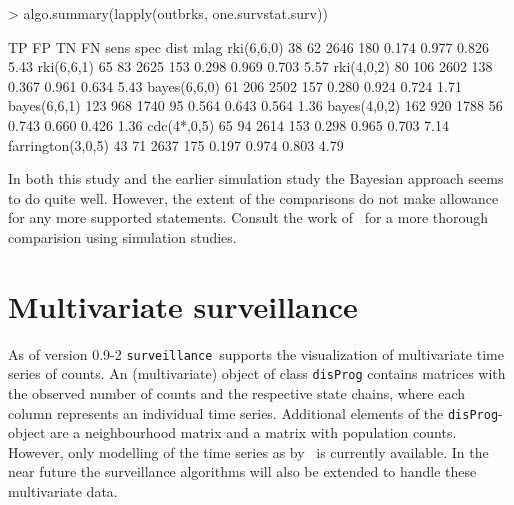 \documentclass[a4paper,11pt]{article}
\newcommand{\surveillance}{\texttt{surveillance}}
\begin{document}
\begin{Schunk}
\end{Schunk}
\begin{Schunk}
\begin{Sinput}
> algo.summary(lapply(outbrks, one.survstat.surv))
\end{Sinput}
\end{Schunk}
\begin{Schunk}
\begin{Soutput}
                   TP  FP   TN  FN  sens  spec  dist mlag
rki(6,6,0)         38  62 2646 180 0.174 0.977 0.826 5.43
rki(6,6,1)         65  83 2625 153 0.298 0.969 0.703 5.57
rki(4,0,2)         80 106 2602 138 0.367 0.961 0.634 5.43
bayes(6,6,0)       61 206 2502 157 0.280 0.924 0.724 1.71
bayes(6,6,1)      123 968 1740  95 0.564 0.643 0.564 1.36
bayes(4,0,2)      162 920 1788  56 0.743 0.660 0.426 1.36
cdc(4*,0,5)        65  94 2614 153 0.298 0.965 0.703 7.14
farrington(3,0,5)  43  71 2637 175 0.197 0.974 0.803 4.79
\end{Soutput}
\end{Schunk}

In both this study and the earlier simulation study the Bayesian
approach seems to do quite well. However, the extent of the
comparisons do not make allowance for any more supported statements.
Consult the work of~\citet{riebler2004} for a more thorough
comparision using simulation studies.

\section{Multivariate surveillance}

As of version 0.9-2 \surveillance\ supports the visualization of
multivariate time series of counts. An (multivariate) object of class
\texttt{disProg} contains matrices with the observed number of counts
and the respective state chains, where each column represents an
individual time series.  Additional elements of the
\texttt{disProg}-object are a neighbourhood matrix and a matrix with
population counts. However, only modelling of the time series as
by~\citet{held2005} is currently available. In the near future the
surveillance algorithms will also be extended to handle these
multivariate data.
\end{document}
